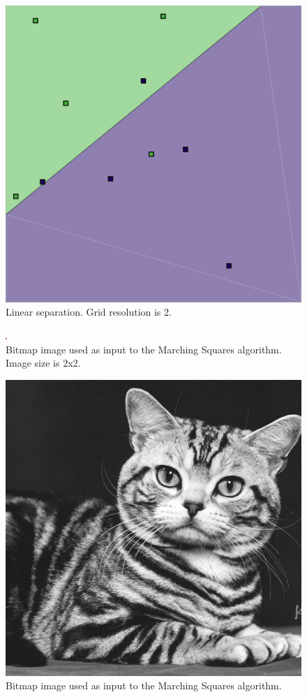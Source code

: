 \documentclass[12pt]{article}
\begin{document}
\begin{figure} 
\centering
  \includegraphics[width = 3 in]{2_res.png}
  \caption{Linear separation. Grid resolution is 2.
}
\end{figure}

\begin{figure} 
\centering
  \includegraphics[width = 3 in]{2_res_image.png}
  \caption{Bitmap image used as input to the Marching Squares algorithm.
Image size is 2x2.
}
\end{figure}








\begin{figure} 
\centering
  \includegraphics[width = 3 in]{cat_image.png}
  \caption{Bitmap image used as input to the Marching Squares algorithm.
}
\end{figure}
\end{document}
